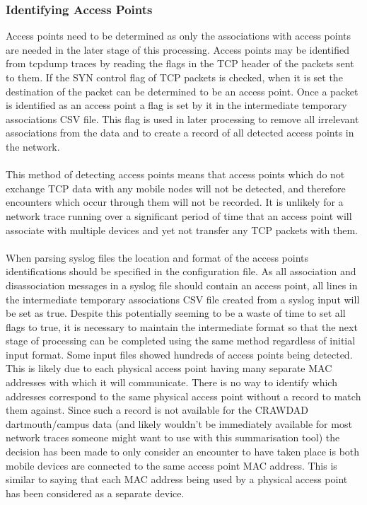 \subsubsection{Identifying Access Points}
Access points need to be determined as only the associations with access points are needed in the later stage of this processing. Access points may be identified from tcpdump traces by reading the flags in the TCP header of the packets sent to them. If the SYN control flag of TCP packets is checked, when it is set the destination of the packet can be determined to be an access point. Once a packet is identified as an access point a flag is set by it in the intermediate temporary associations CSV file. This flag is used in later processing to remove all irrelevant associations from the data and to create a record of all detected access points in the network.\\\\
This method of detecting access points means that access points which do not exchange TCP data with any mobile nodes will not be detected, and therefore encounters which occur through them will not be recorded. It is unlikely for a network trace running over a significant period of time that an access point will associate with multiple devices and yet not transfer any TCP packets with them.\\\\
When parsing syslog files the location and format of the access points identifications should be specified in the configuration file. As all association and disassociation messages in a syslog file should contain an access point, all lines in the intermediate temporary associations CSV file created from a syslog input will be set as true. Despite this potentially seeming to be a waste of time to set all flags to true, it is necessary to maintain the intermediate format so that the next stage of processing can be completed using the same method regardless of initial input format.
Some input files showed hundreds of access points being detected. This is likely due to each physical access point having many separate MAC addresses with which it will communicate. There is no way to identify which addresses correspond to the same physical access point without a record to match them against. Since such a record is not available for the CRAWDAD dartmouth/campus data (and likely wouldn't be immediately available for most network traces someone might want to use with this summarisation tool) the decision has been made to only consider an encounter to have taken place is both mobile devices are connected to the same access point MAC address. This is similar to saying that each MAC address being used by a physical access point has been considered as a separate device.
